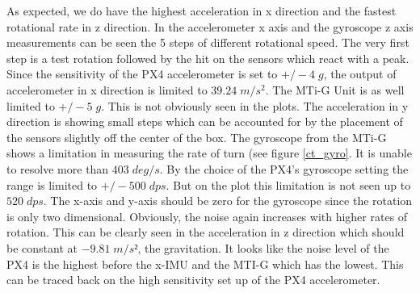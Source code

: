 As expected, we do have the highest acceleration in x direction and the fastest rotational rate in z direction. In the accelerometer x axis and the gyroscope z axis measurements can be seen the 5 steps of different rotational speed. The very first step is a test rotation followed by the hit on the sensors which react with a peak. Since the sensitivity of the PX4 accelerometer is set to $+/- 4 \;g$, the output of accelerometer in x direction is limited to $39.24 \;m/s^2$. The MTi-G Unit is as well limited to $+/- 5\;g$. This is not obviously seen in the plots. The acceleration in y direction is showing small steps which can be accounted for by the placement of the sensors slightly off the center of the box. The gyroscope from the MTi-G shows a limitation in measuring the rate of turn (see figure \ref{ct_gyro}. It is unable to resolve more than $ 403 \;deg/s$. By the choice of the PX4's gyroscope setting the range is limited to $+/- 500\;dps$. But on the plot this limitation is not seen up to $520\;dps$. The x-axis and y-axis should be zero for the gyroscope since the rotation is only two dimensional. Obviously, the noise again increases with higher rates of rotation. This can be clearly seen in the acceleration in z direction which should be constant at $-9.81 \;m/s²$, the gravitation. It looks like the noise level of the PX4 is the highest before the x-IMU and the MTI-G which has the lowest. This can be traced back on the high sensitivity set up of the PX4 accelerometer.



